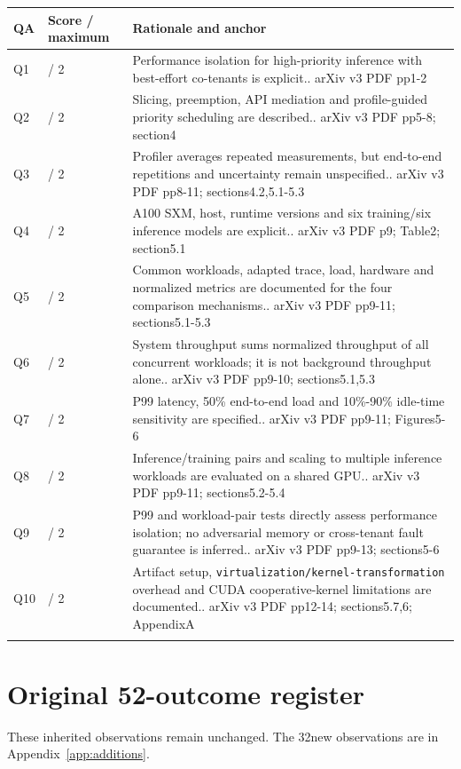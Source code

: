 \begin{longtable}{>{\raggedright\arraybackslash}p{}>{\raggedright\arraybackslash}p{}>{\raggedright\arraybackslash}p{}}
\toprule
\textbf{QA} & \textbf{Score / maximum} & \textbf{Rationale and anchor}\\\midrule\endhead
Q1 & 2 / 2 & Performance isolation for high-priority inference with best-effort co-tenants is explicit.. arXiv v3 PDF pp1-2\\\addlinespace
Q2 & 2 / 2 & Slicing, preemption, API mediation and profile-guided priority scheduling are described.. arXiv v3 PDF pp5-8; section4\\\addlinespace
Q3 & 1 / 2 & Profiler averages repeated measurements, but end-to-end repetitions and uncertainty remain unspecified.. arXiv v3 PDF pp8-11; sections4.2,5.1-5.3\\\addlinespace
Q4 & 2 / 2 & A100 SXM, host, runtime versions and six training/six inference models are explicit.. arXiv v3 PDF p9; Table2; section5.1\\\addlinespace
Q5 & 2 / 2 & Common workloads, adapted trace, load, hardware and normalized metrics are documented for the four comparison mechanisms.. arXiv v3 PDF pp9-11; sections5.1-5.3\\\addlinespace
Q6 & 2 / 2 & System throughput sums normalized throughput of all concurrent workloads; it is not background throughput alone.. arXiv v3 PDF pp9-10; sections5.1,5.3\\\addlinespace
Q7 & 2 / 2 & P99 latency, 50\% end-to-end load and 10\%-90\% idle-time sensitivity are specified.. arXiv v3 PDF pp9-11; Figures5-6\\\addlinespace
Q8 & 2 / 2 & Inference/training pairs and scaling to multiple inference workloads are evaluated on a shared GPU.. arXiv v3 PDF pp9-11; sections5.2-5.4\\\addlinespace
Q9 & 2 / 2 & P99 and workload-pair tests directly assess performance isolation; no adversarial memory or cross-tenant fault guarantee is inferred.. arXiv v3 PDF pp9-13; sections5-6\\\addlinespace
Q10 & 2 / 2 & Artifact setup, \nolinkurl{virtualization/kernel-transformation} overhead and CUDA cooperative-kernel limitations are documented.. arXiv v3 PDF pp12-14; sections5.7,6; AppendixA\\\addlinespace
\bottomrule\end{longtable}

\clearpage\section{Original 52-outcome register}\label{app:evidence}
These inherited observations remain unchanged. The 32new observations are in Appendix~\ref{app:additions}.

